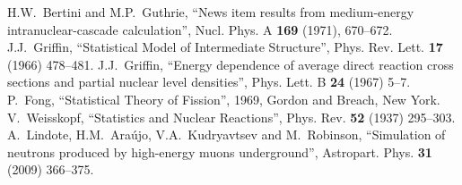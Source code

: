 \documentclass[article]{IEEEtran}
\begin{document}
\begin{thebibliography}{1}
%
H.W.~Bertini and M.P.~Guthrie,
``News item results from medium-energy intranuclear-cascade calculation'',
Nucl. Phys. A \textbf{169} (1971), 670--672.
%
J.J.~Griffin,
``Statistical Model of Intermediate Structure'',
Phys. Rev. Lett. \textbf{17} (1966) 478--481.
%
J.J.~Griffin,
``Energy dependence of average direct reaction cross sections and partial nuclear level densities'',
Phys. Lett. B \textbf{24} (1967) 5--7.
%
P.~Fong, ``Statistical Theory of Fission'', 1969, Gordon and Breach, New
York.
%
V.~Weisskopf,
``Statistics and Nuclear Reactions'',
Phys. Rev. \textbf{52} (1937) 295--303.
%
A.~Lindote, H.M.~Ara\'{u}jo, V.A.~Kudryavtsev and M.~Robinson,
``Simulation of neutrons produced by high-energy muons underground'',
Astropart. Phys. \textbf{31} (2009) 366--375.


\end{thebibliography}
\end{document}
